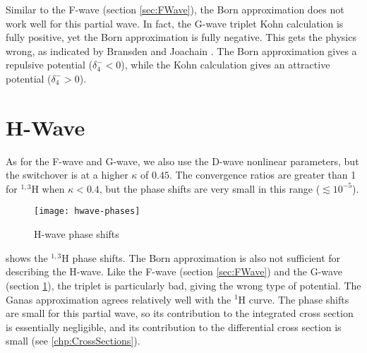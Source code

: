 \documentclass[Dissertation.tex]{subfiles}
\begin{document}
Similar to the F-wave (section \ref{sec:FWave}), the Born approximation 
does not work well for this partial wave. In fact, the G-wave triplet Kohn 
calculation is fully positive, yet the Born approximation is fully negative. 
This gets the physics wrong, as indicated by Bransden and Joachain
\citep[p.589]{Bransden2003}. The Born approximation gives a repulsive potential
($\delta_4^- < 0$), while the Kohn calculation gives an attractive potential
($\delta_4^- > 0$).


\section{H-Wave}
\label{sec:HWave}

As for the F-wave and G-wave, we also use the D-wave nonlinear
parameters, but the switchover is at a higher $\kappa$ of $0.45$.
The convergence ratios are greater than 1 for $^{1,3}$H when
$\kappa < 0.4$, but the phase shifts are very small in this range
($\lesssim 10^{-5}$). 

\begin{figure}
	\centering
	\texttt{[image: hwave-phases]}
	\caption{H-wave phase shifts}
	\label{fig:HWavePhase}
\end{figure}


 shows the $^{1,3}$H phase shifts.
The Born approximation is also not sufficient for describing the H-wave. Like 
the F-wave (section \ref{sec:FWave}) and the G-wave (section \ref{sec:HWave}),
the triplet is particularly bad, giving the wrong type of potential.
The Ganas approximation agrees relatively well with the $^1$H curve. The 
phase shifts are small for this partial wave, so its contribution to the 
integrated cross section is essentially negligible, and its contribution
to the differential cross section is small (see \cref{chp:CrossSections}).
\end{document}
